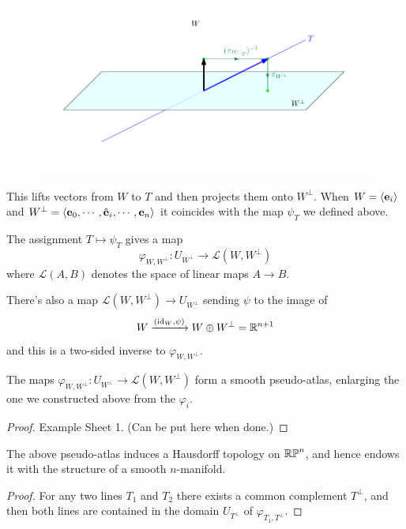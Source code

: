 \documentclass[a4paper,11pt]{article}
\begin{document}
	\begin{figure}[H]
		\centering
		\includegraphics[width=\linewidth]{fig/fig8.pdf}
	\end{figure}

	This lifts vectors from $W$ to $T$ and then projects them onto $W^\perp$. When $W = \expval{\vb e_i}$ and $W^\perp = \expval{\vb e_0, \cdots , \hat{\vb e}_i, \cdots, \vb e_n}$ it coincides with the map $\psi_T$ we defined above.
	
	The assignment $T \mapsto \psi_T$ gives a map
	\[
		\varphi_{W,W^\perp} : U_{W^\perp} \to \mathcal{L}(W, W^\perp)
	\]
	where $\mathcal{L}(A,B)$ denotes the space of linear maps $A \to B$.

	There's also a map $\mathcal{L}(W,W^\perp) \to U_{W^\perp}$ sending $\psi$ to the image of
	\[
		W \xrightarrow{(\operatorname{id}_W, \psi)} W \oplus W^\perp = \mathbb{R}^{n+1}
	\]
	and this is a two-sided inverse to $\varphi_{W,W^\perp}$.
	
	\begin{lem}
		The maps $\varphi_{W,W^\perp} : U_{W^\perp} \to \mathcal{L}(W,W^\perp)$ form a smooth pseudo-atlas, enlarging the one we constructed above from the $\varphi_i$.
	\end{lem}
	\begin{proof}
		Example Sheet 1. (Can be put here when done.)
	\end{proof}

	\begin{prop}
		The above pseudo-atlas induces a Hausdorff topology on $\mathbb{RP}^{n}$, and hence endows it with the structure of a smooth $n$-manifold.
	\end{prop}
	\begin{proof}
		For any two lines $T_1$ and $T_2$ there exists a common complement $T^\perp$, and then both lines are contained in the domain $U_{T^\perp}$ of $\varphi_{T_1, T^\perp}$.
	\end{proof}
\end{document}
